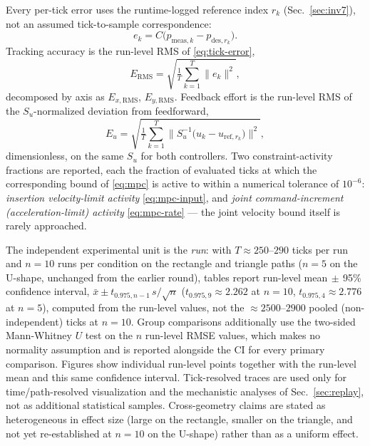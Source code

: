 \documentclass[journal]{IEEEtran}
\begin{document}
Every per-tick error uses the runtime-logged reference index $r_k$
(Sec.~\ref{sec:inv7}), not an assumed tick-to-sample correspondence:
\begin{equation}
e_k = C\big(p_{\mathrm{meas},k}-p_{\mathrm{des},r_k}\big).
\label{eq:tick-error}
\end{equation}
Tracking accuracy is the run-level RMS of \eqref{eq:tick-error},
\begin{equation}
E_{\mathrm{RMS}} = \sqrt{\tfrac1T\textstyle\sum_{k=1}^{T}\lVert e_k\rVert^2},
\label{eq:e-rms}
\end{equation}
decomposed by axis as $E_{x,\mathrm{RMS}}$, $E_{y,\mathrm{RMS}}$.
Feedback effort is the run-level RMS of the $S_u$-normalized deviation
from feedforward,
\begin{equation}
E_u = \sqrt{\tfrac1T\textstyle\sum_{k=1}^{T}
\big\lVert S_u^{-1}\big(u_k-u_{\mathrm{ref},r_k}\big)\big\rVert^2},
\label{eq:e-u}
\end{equation}
dimensionless, on the same $S_u$ for both controllers. Two
constraint-activity fractions are reported, each the fraction of
evaluated ticks at which the corresponding bound of \eqref{eq:mpc} is
active to within a numerical tolerance of $10^{-6}$: \emph{insertion
velocity-limit activity} \eqref{eq:mpc-input}, and \emph{joint
command-increment (acceleration-limit) activity} \eqref{eq:mpc-rate} ---
the joint velocity bound itself is rarely approached.

The independent experimental unit is the \emph{run}: with
$T\!\approx\!250$--$290$ ticks per run and $n=10$ runs per condition on
the rectangle and triangle paths ($n=5$ on the U-shape, unchanged from
the earlier round), tables report run-level mean$\,\pm\,$95\% confidence
interval, $\bar x\pm t_{0.975,n-1}\,s/\sqrt n$ ($t_{0.975,9}\approx2.262$
at $n=10$, $t_{0.975,4}\approx2.776$ at $n=5$), computed from the
run-level values, not the $\approx\!2500$--$2900$ pooled
(non-independent) ticks at $n=10$. Group comparisons additionally use the
two-sided Mann-Whitney $U$ test on the $n$ run-level RMSE values, which
makes no normality assumption and is reported alongside the CI for every
primary comparison. Figures show individual run-level points together
with the run-level mean and this same confidence interval. Tick-resolved
traces are used only for time/path-resolved visualization and the
mechanistic analyses of Sec.~\ref{sec:replay}, not as additional
statistical samples. Cross-geometry claims are stated as heterogeneous in
effect size (large on the rectangle, smaller on the triangle, and not yet
re-established at $n=10$ on the U-shape) rather than as a uniform effect.
\end{document}
